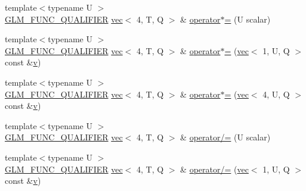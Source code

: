 \begin{DoxyCompactItemize}
\item 
{\footnotesize template$<$typename U $>$ }\\\mbox{\hyperlink{setup_8hpp_a33fdea6f91c5f834105f7415e2a64407}{G\+L\+M\+\_\+\+F\+U\+N\+C\+\_\+\+Q\+U\+A\+L\+I\+F\+I\+ER}} \mbox{\hyperlink{structglm_1_1vec}{vec}}$<$ 4, T, Q $>$ \& \mbox{\hyperlink{structglm_1_1vec_3_014_00_01_t_00_01_q_01_4_ada4128504595a3a6aae32660a1461dea}{operator$\ast$=}} (U scalar)
\item 
{\footnotesize template$<$typename U $>$ }\\\mbox{\hyperlink{setup_8hpp_a33fdea6f91c5f834105f7415e2a64407}{G\+L\+M\+\_\+\+F\+U\+N\+C\+\_\+\+Q\+U\+A\+L\+I\+F\+I\+ER}} \mbox{\hyperlink{structglm_1_1vec}{vec}}$<$ 4, T, Q $>$ \& \mbox{\hyperlink{structglm_1_1vec_3_014_00_01_t_00_01_q_01_4_af1a51a8de8525cfcb5273513daaf1b04}{operator$\ast$=}} (\mbox{\hyperlink{structglm_1_1vec}{vec}}$<$ 1, U, Q $>$ const \&\mbox{\hyperlink{_s_d_l__opengl_8h_a10a82eabcb59d2fcd74acee063775f90}{v}})
\item 
{\footnotesize template$<$typename U $>$ }\\\mbox{\hyperlink{setup_8hpp_a33fdea6f91c5f834105f7415e2a64407}{G\+L\+M\+\_\+\+F\+U\+N\+C\+\_\+\+Q\+U\+A\+L\+I\+F\+I\+ER}} \mbox{\hyperlink{structglm_1_1vec}{vec}}$<$ 4, T, Q $>$ \& \mbox{\hyperlink{structglm_1_1vec_3_014_00_01_t_00_01_q_01_4_a8223cbe0c80067bda5e8a87ebc4098cf}{operator$\ast$=}} (\mbox{\hyperlink{structglm_1_1vec}{vec}}$<$ 4, U, Q $>$ const \&\mbox{\hyperlink{_s_d_l__opengl_8h_a10a82eabcb59d2fcd74acee063775f90}{v}})
\item 
{\footnotesize template$<$typename U $>$ }\\\mbox{\hyperlink{setup_8hpp_a33fdea6f91c5f834105f7415e2a64407}{G\+L\+M\+\_\+\+F\+U\+N\+C\+\_\+\+Q\+U\+A\+L\+I\+F\+I\+ER}} \mbox{\hyperlink{structglm_1_1vec}{vec}}$<$ 4, T, Q $>$ \& \mbox{\hyperlink{structglm_1_1vec_3_014_00_01_t_00_01_q_01_4_ab603e1376b20ee1ba7060973d0028adb}{operator/=}} (U scalar)
\item 
{\footnotesize template$<$typename U $>$ }\\\mbox{\hyperlink{setup_8hpp_a33fdea6f91c5f834105f7415e2a64407}{G\+L\+M\+\_\+\+F\+U\+N\+C\+\_\+\+Q\+U\+A\+L\+I\+F\+I\+ER}} \mbox{\hyperlink{structglm_1_1vec}{vec}}$<$ 4, T, Q $>$ \& \mbox{\hyperlink{structglm_1_1vec_3_014_00_01_t_00_01_q_01_4_a7ee45c65277f9dfee48514e35d163a6a}{operator/=}} (\mbox{\hyperlink{structglm_1_1vec}{vec}}$<$ 1, U, Q $>$ const \&\mbox{\hyperlink{_s_d_l__opengl_8h_a10a82eabcb59d2fcd74acee063775f90}{v}})
\item 

\end{DoxyCompactItemize}
